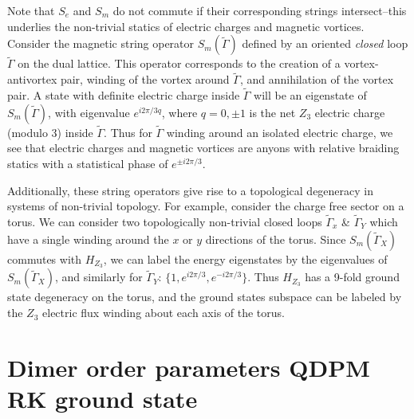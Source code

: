 \documentclass[twocolumn,prb,aps,floatfix,superscriptaddress]{revtex4-1}
\begin{document}
Note that  $S_e$ and $S_m$ do not commute if their corresponding strings intersect--this underlies the non-trivial statics of electric charges and magnetic vortices. Consider the magnetic string operator $S_m(\tilde{\Gamma})$ defined by an oriented \emph{closed} loop $\tilde{\Gamma}$ on the dual lattice. This operator corresponds to the creation of a vortex-antivortex pair, winding of the vortex around $\tilde{\Gamma}$, and annihilation of the vortex pair. A state with definite electric charge inside $\tilde{\Gamma}$ will be an eigenstate of $S_m(\tilde{\Gamma})$, with eigenvalue $e^{ i 2 \pi/3 q}$, where $q=0,\pm1$ is the net $Z_3$ electric charge (modulo 3) inside $\tilde{\Gamma}$. Thus for $\tilde{\Gamma}$ winding around an isolated electric charge, we see that electric charges and magnetic vortices are anyons with relative braiding statics with a statistical phase of $e^{\pm i 2\pi/3}$.

Additionally, these string operators give rise to a topological degeneracy in systems of non-trivial topology. For example, consider the charge free sector on a torus. We can consider two topologically non-trivial closed loops $\tilde{\Gamma}_{x}$ \& $\tilde{\Gamma}_{Y}$ which have a single winding around the $x$ or $y$ directions of the torus. Since $S_m(\tilde{\Gamma}_{X})$ commutes with $H_{Z_3}$, we can label the energy eigenstates by the eigenvalues of $S_m(\tilde{\Gamma}_{X})$, and similarly for $\tilde{\Gamma}_Y$: $\{1,e^{ i 2\pi/3},e^{- i 2\pi/3}\}$. Thus $H_{Z_3}$ has a 9-fold ground state degeneracy on the torus, and the ground states subspace can be labeled by the $Z_3$ electric flux winding about each axis of the torus.
            
\section{Dimer order parameters QDPM RK ground state}
\label{sec:dimer_order_parameters}
%
\end{document}

